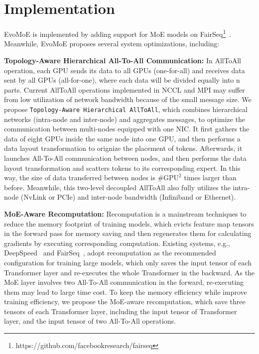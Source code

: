 \section{Implementation}
\label{sec:impl}
EvoMoE is implemented by adding support for MoE models on FairSeq\footnote{https://github.com/facebookresearch/fairseq}~\cite{FairScale2021}. Meanwhile, EvoMoE proposes several system optimizations, including: 

\textbf{Topology-Aware Hierarchical All-To-All Communication:}
In AllToAll operation, each GPU sends its data to all GPUs (one-for-all) and receives data sent by all GPUs (all-for-one), where each data will be divided equally into n parts.
Current AllToAll operations implemented in NCCL and MPI may suffer from low utilization of network bandwidth because of the small message size.  We propose \texttt{Topology-Aware Hierarchical AllToAll}, which combines hierarchical networks (intra-node and inter-node) and aggregates messages, to optimize the communication between multi-nodes equipped with one NIC. It first gathers the data of eight GPUs inside the same node into one GPU, and then performs a data layout transformation to orignize the placement of tokens. Afterwards, it launches All-To-All communication between nodes, and then performs the data layout transformation and scatters tokens to its corresponding expert. In this way, the size of data transferred between nodes is ${\#\text{GPU}}^2$ times larger than before. 
Meanwhile, this two-level decoupled AllToAll also fully utilizes the intra-node (NvLink or PCIe) and inter-node bandwidth (Infiniband or Ethernet).

\textbf{MoE-Aware Recomputation:} Recomputation is a mainstream techniques to reduce the memory footprint of training models, which evicts feature map tensors in the forward pass for memory saving and then regenerates them for calculating gradients by executing corresponding computation. Existing systems, e.g., DeepSpeed~\cite{DBLP:conf/kdd/deepspeed} and FairSeq~\cite{DBLP:conf/naacl/fairseq}, 
adopt recomputation as the recommended configuration for training large models, which only saves the input tensor of each Transformer layer and re-executes the whole Transformer in the backward. As the MoE layer involves two All-To-All communication in the forward, re-executing them may lead to large time cost. To keep the memory efficiency while improve training efficiency, we propose the MoE-aware recomputation, which save three tensors of each Transformer layer, including the input tensor of Transformer layer, and the input tensor of two All-To-All operations.

